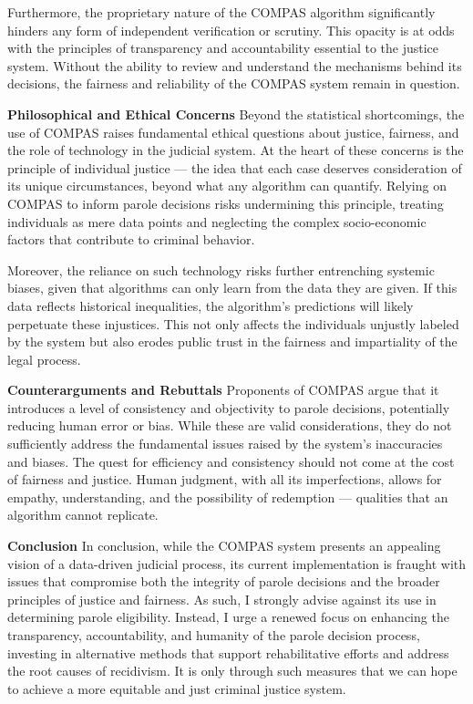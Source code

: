 \documentclass[
]{article}
\begin{document}
Furthermore, the proprietary nature of the COMPAS algorithm
significantly hinders any form of independent verification or scrutiny.
This opacity is at odds with the principles of transparency and
accountability essential to the justice system. Without the ability to
review and understand the mechanisms behind its decisions, the fairness
and reliability of the COMPAS system remain in question.

\textbf{Philosophical and Ethical Concerns} Beyond the statistical
shortcomings, the use of COMPAS raises fundamental ethical questions
about justice, fairness, and the role of technology in the judicial
system. At the heart of these concerns is the principle of individual
justice --- the idea that each case deserves consideration of its unique
circumstances, beyond what any algorithm can quantify. Relying on COMPAS
to inform parole decisions risks undermining this principle, treating
individuals as mere data points and neglecting the complex
socio-economic factors that contribute to criminal behavior.

Moreover, the reliance on such technology risks further entrenching
systemic biases, given that algorithms can only learn from the data they
are given. If this data reflects historical inequalities, the
algorithm's predictions will likely perpetuate these injustices. This
not only affects the individuals unjustly labeled by the system but also
erodes public trust in the fairness and impartiality of the legal
process.

\textbf{Counterarguments and Rebuttals} Proponents of COMPAS argue that
it introduces a level of consistency and objectivity to parole
decisions, potentially reducing human error or bias. While these are
valid considerations, they do not sufficiently address the fundamental
issues raised by the system's inaccuracies and biases. The quest for
efficiency and consistency should not come at the cost of fairness and
justice. Human judgment, with all its imperfections, allows for empathy,
understanding, and the possibility of redemption --- qualities that an
algorithm cannot replicate.

\textbf{Conclusion} In conclusion, while the COMPAS system presents an
appealing vision of a data-driven judicial process, its current
implementation is fraught with issues that compromise both the integrity
of parole decisions and the broader principles of justice and fairness.
As such, I strongly advise against its use in determining parole
eligibility. Instead, I urge a renewed focus on enhancing the
transparency, accountability, and humanity of the parole decision
process, investing in alternative methods that support rehabilitative
efforts and address the root causes of recidivism. It is only through
such measures that we can hope to achieve a more equitable and just
criminal justice system.
\end{document}
